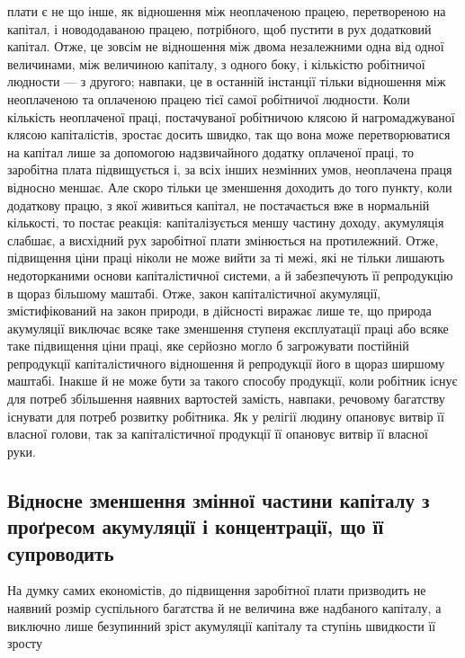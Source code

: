 \parcont{}  %
плати є не що інше, як відношення між неоплаченою працею,
перетвореною на капітал, і новододаваною працею, потрібного, щоб
пустити в рух додатковий капітал. Отже, це зовсім не відношення
між двома незалежними одна від одної величинами, між величиною
капіталу, з одного боку, і кількістю робітничої людности —
з другого; навпаки, це в останній інстанції тільки відношення
між неоплаченою та оплаченою працею тієї самої робітничої людности.
Коли кількість неоплаченої праці, постачуваної робітничою
клясою й нагромаджуваної клясою капіталістів, зростає
досить швидко, так що вона може перетворюватися на капітал
лише за допомогою надзвичайного додатку оплаченої праці, то
заробітна плата підвищується і, за всіх інших незмінних умов,
неоплачена праця відносно меншає. Але скоро тільки це зменшення
доходить до того пункту, коли додаткову працю, з якої
живиться капітал, не постачається вже в нормальній кількості,
то постає реакція: капіталізується меншу частину доходу, акумуляція
слабшає, а висхідний рух заробітної плати змінюється
на протилежний. Отже, підвищення ціни праці ніколи не може
вийти за ті межі, які не тільки лишають недоторканими основи
капіталістичної системи, а й забезпечують її репродукцію в
щораз більшому маштабі. Отже, закон капіталістичної акумуляції,
змістифікований на закон природи, в дійсності виражає
лише те, що природа акумуляції виключає всяке таке зменшення
ступеня експлуатації праці або всяке таке підвищення ціни
праці, яке серйозно могло б загрожувати постійній репродукції
капіталістичного відношення й репродукції його в щораз ширшому
маштабі. Інакше й не може бути за такого способу продукції,
коли робітник існує для потреб збільшення наявних вартостей
замість, навпаки, речовому багатству існувати для потреб
розвитку робітника. Як у релігії людину опановує витвір її власної
голови, так за капіталістичної продукції її опановує витвір
її власної руки.

\manualpagebreak{}
\subsection{Відносне зменшення змінної частини капіталу з проґресом
акумуляції і концентрації, що її супроводить}

На думку самих економістів, до підвищення заробітної плати
призводить не наявний розмір суспільного багатства й не величина
вже надбаного капіталу, а виключно лише безупинний
зріст акумуляції капіталу та ступінь швидкости її зросту
\parbreak{}  %
